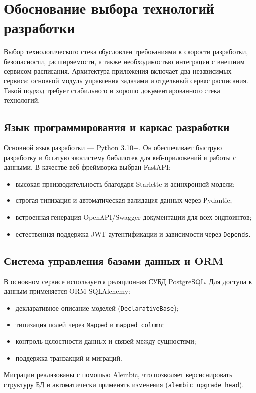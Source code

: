 \section{Обоснование выбора технологий разработки}

Выбор технологического стека обусловлен требованиями к скорости разработки, безопасности, расширяемости, а также необходимостью интеграции с внешним сервисом расписания. Архитектура приложения включает два независимых сервиса: основной модуль управления задачами и отдельный сервис расписания. Такой подход требует стабильного и хорошо документированного стека технологий.

\subsection{Язык программирования и каркас разработки}

Основной язык разработки --- Python 3.10+. Он обеспечивает быструю разработку и богатую экосистему библиотек для веб-приложений и работы с данными. В качестве веб-фреймворка выбран FastAPI:
\begin{itemize}
    \item высокая производительность благодаря Starlette и асинхронной модели;
    \item строгая типизация и автоматическая валидация данных через Pydantic;
    \item встроенная генерация OpenAPI/Swagger документации для всех эндпоинтов;
    \item естественная поддержка JWT-аутентификации и зависимости через \texttt{Depends}.
\end{itemize}

\subsection{Система управления базами данных и ORM}

В основном сервисе используется реляционная СУБД PostgreSQL. Для доступа к данным применяется ORM SQLAlchemy:
\begin{itemize}
    \item декларативное описание моделей (\texttt{DeclarativeBase});
    \item типизация полей через \texttt{Mapped} и \texttt{mapped\_column};
    \item контроль целостности данных и связей между сущностями;
    \item поддержка транзакций и миграций.
\end{itemize}
Миграции реализованы с помощью Alembic, что позволяет версионировать структуру БД и автоматически применять изменения (\texttt{alembic upgrade head}).

